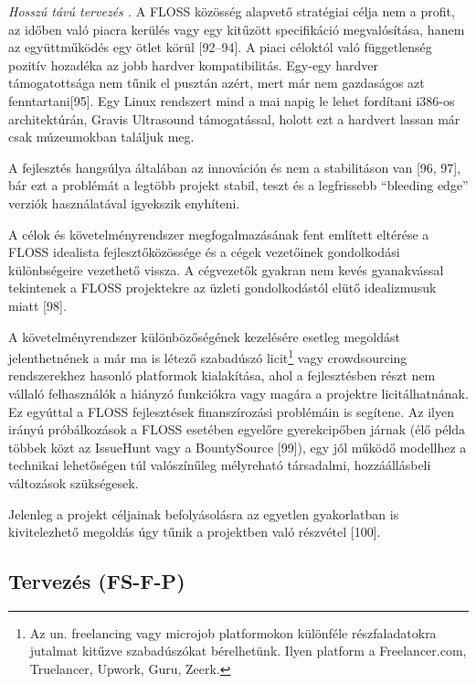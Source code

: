 \documentclass[12pt,magyar,a4paper,oneside]{scrreprt}
\begin{document}
\emph{Hosszú távú tervezés .} A FLOSS közösség alapvető stratégiai célja
nem a profit, az időben való piacra kerülés vagy egy kitűzött
specifikáció megvalósítása, hanem az együttműködés egy ötlet körül
{[}92--94{]}. A piaci céloktól való függetlenség pozitív hozadéka az
jobb hardver kompatibilitás. Egy-egy hardver támogatottsága nem tűnik el
pusztán azért, mert már nem gazdaságos azt fenntartani{[}95{]}. Egy
Linux rendszert mind a mai napig le lehet fordítani i386-os
architektúrán, Gravis Ultrasound támogatással, holott ezt a hardvert
lassan már csak múzeumokban találjuk meg.

A fejlesztés hangsúlya általában az innováción és nem a stabilitáson van
{[}96, 97{]}, bár ezt a problémát a legtöbb projekt stabil, teszt és a
legfrissebb ``bleeding edge'' verziók használatával igyekszik enyhíteni.

A célok és követelményrendszer megfogalmazásának fent említett eltérése
a FLOSS idealista fejlesztőközössége és a cégek vezetőinek gondolkodási
különbségeire vezethető vissza. A cégvezetők gyakran nem kevés
gyanakvással tekintenek a FLOSS projektekre az üzleti gondolkodástól
elütő idealizmusuk miatt {[}98{]}.

A követelményrendszer különbözőségének kezelésére esetleg megoldást
jelenthetnének a már ma is létező szabadúszó licit\footnote{Az un.
  freelancing vagy microjob platformokon különféle részfaladatokra
  jutalmat kitűzve szabadúszókat bérelhetünk. Ilyen platform a
  Freelancer.com, Truelancer, Upwork, Guru, Zeerk.} vagy crowdsourcing
rendszerekhez hasonló platformok kialakítása, ahol a fejlesztésben részt
nem vállaló felhasználók a hiányzó funkciókra vagy magára a projektre
licitálhatnának. Ez egyúttal a FLOSS fejlesztések finanszírozási
problémáin is segítene. Az ilyen irányú próbálkozások a FLOSS esetében
egyelőre gyerekcipőben járnak (élő példa többek közt az IssueHunt vagy a
BountySource {[}99{]}), egy jól működő modellhez a technikai lehetőségen
túl valószínűleg mélyreható társadalmi, hozzáállásbeli változások
szükségesek.

Jelenleg a projekt céljainak befolyásolásra az egyetlen gyakorlatban is
kivitelezhető megoldás úgy tűnik a projektben való részvétel {[}100{]}.

\hypertarget{sec:FS-F-P}{%
\subsection{Tervezés (FS-F-P)}\label{sec:FS-F-P}}
\end{document}
